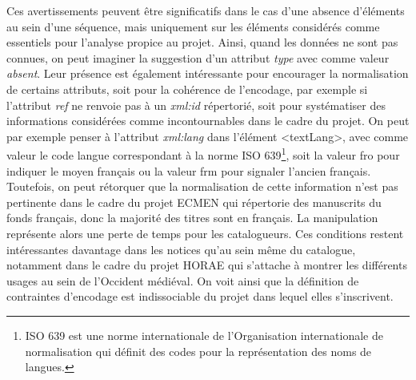 \documentclass[a4paper,12pt,twoside]{book}
\begin{document}
	Ces avertissements peuvent être significatifs dans le cas d’une absence d’éléments au sein d’une séquence, mais uniquement sur les éléments considérés comme essentiels pour l’analyse propice au projet. Ainsi, quand les données ne sont pas connues, on peut imaginer la suggestion d'un attribut \textit{type} avec comme valeur \textit{absent}. Leur présence est également intéressante pour encourager la normalisation de certains attributs, soit pour la cohérence de l’encodage, par exemple si l’attribut \textit{ref} ne renvoie pas à un \textit{xml:id} répertorié, soit pour systématiser des informations considérées comme incontournables dans le cadre du projet. On peut par exemple penser à l’attribut \textit{xml:lang} dans l’élément \textless textLang\textgreater, avec comme valeur le code langue correspondant à la norme ISO 639\footnote{ISO 639 est une norme internationale de l’Organisation internationale de normalisation qui définit des codes pour la représentation des noms de langues.}, soit la valeur \og fro\fg{} pour indiquer le moyen français ou la valeur \og frm\fg{} pour signaler l’ancien français. Toutefois, on peut rétorquer que la normalisation de cette information n’est pas pertinente dans le cadre du projet ECMEN qui répertorie des manuscrits du fonds français, donc la majorité des titres sont en français. La manipulation représente alors une perte de temps pour les catalogueurs. Ces conditions restent intéressantes davantage dans les notices qu’au sein même du catalogue, notamment dans le cadre du projet HORAE qui s'attache à montrer les différents usages au sein de l'Occident médiéval. On voit ainsi que la définition de contraintes d'encodage est indissociable du projet dans lequel elles s'inscrivent.
	
\end{document}
